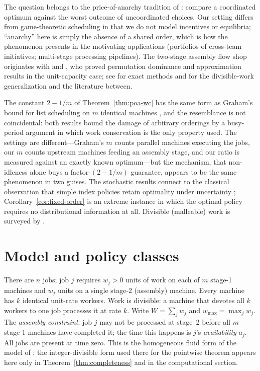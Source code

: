 \documentclass[sn-mathphys,NameDate]{sn-jnl}
\theoremstyle{thmstyleone}
\theoremstyle{thmstylethree}
\theoremstyle{thmstyletwo}
\begin{document}
The question belongs to the price-of-anarchy tradition of
\citet{koutsoupias1999}: compare a coordinated optimum against the
worst outcome of uncoordinated choices. Our setting differs from
game-theoretic scheduling in that we do not model incentives or
equilibria; ``anarchy'' here is simply the absence of a shared
order, which is how the phenomenon presents in the motivating
applications (portfolios of cross-team initiatives; multi-stage
processing pipelines). The two-stage assembly flow shop originates
with \citet{lee1993} and \citet{potts1995}, who proved permutation
dominance and approximation results in the unit-capacity case; see
\citet{hariri1997} for exact methods and \citet{bowmanA} for the
divisible-work generalization and the literature between.

The constant $2 - 1/m$ of Theorem~\ref{thm:poa-wc} has the same
form as Graham's bound for list scheduling on $m$ identical
machines \citep{graham1966,graham1979}, and the resemblance is not
coincidental: both results bound the damage of arbitrary orderings
by a busy-period argument in which work conservation is the only
property used. The settings are different---Graham's $m$ counts
parallel machines executing the jobs, our $m$ counts upstream
machines feeding an assembly stage, and our ratio is measured
against an exactly known optimum---but the mechanism, that
non-idleness alone buys a factor-$(2-1/m)$ guarantee, appears to be
the same phenomenon in two guises. The stochastic results connect
to the classical observation that simple index policies retain
optimality under uncertainty \citep{rothkopf1966,smith1956,
pinedo2016}; Corollary~\ref{cor:fixed-order} is an extreme instance
in which the optimal policy requires no distributional information
at all. Divisible (malleable) work is surveyed by
\citet{drozdowski2009}.

\section{Model and policy classes}
\label{sec:model}

There are $n$ jobs; job $j$ requires $w_j > 0$ units of work on
each of $m$ stage-1 machines and $w_j$ units on a single stage-2
(assembly) machine. Every machine has $k$ identical unit-rate
workers. Work is divisible: a machine that devotes all $k$ workers
to one job processes it at rate $k$. Write
$W = \sum_j w_j$ and $w_{\max} = \max_j w_j$. The
\emph{assembly constraint}: job $j$ may not be processed at stage~2
before all $m$ stage-1 machines have completed it; the time this
happens is $j$'s \emph{availability} $a_j$. All jobs are present at
time zero. This is the homogeneous fluid form of the model of
\citet{bowmanA}; the integer-divisible form used there for the
pointwise theorem appears here only in
Theorem~\ref{thm:completeness} and in the computational section.
\end{document}
